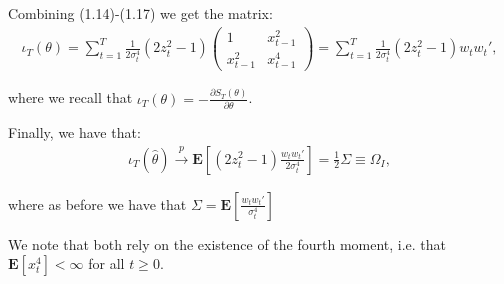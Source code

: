 \documentclass[11pt,a4paper,oneside]{article}
\newcommand{\lp}{\left(}
\newcommand{\rp}{\right)}
\newcommand{\rb}{\right]}
\newcommand{\lb}{\left[}
\newcommand{\ee}{\mathbf{E}}
\newcommand{\sumt}{\sum_{t=1}^T}
\begin{document}
Combining (1.14)-(1.17) we get the matrix:
\begin{align}
    \iota_T\lp \theta\rp =
        \sumt \frac{1}{2\sigma_t^4}\lp 2z_t^2 - 1\rp
        \begin{pmatrix}
            1           &   x_{t-1}^2\\
            x_{t-1}^2   &   x_{t-1}^4
        \end{pmatrix}
        = \sumt \frac{1}{2\sigma_t^4}\lp 2z_t^2 - 1\rp w_t w_t',
\end{align}

where we recall that $\iota_T\lp \theta\rp = - \frac{\partial S_T\lp \theta\rp}{\partial \theta}$.

Finally, we have that:
\begin{align}
    \iota_T\lp \hat \theta\rp \overset{p}{\rightarrow}\ee\lb \lp 2 z_t^2 - 1\rp \frac{w_tw_t'}{2 \sigma_t^4}\rb = \frac{1}{2}\Sigma \equiv \Omega_I,
\end{align}

where as before we have that $\Sigma = \ee\lb \frac{w_t w_t'}{\sigma_t^4}\rb$

We note that both rely on the existence of the fourth moment, i.e. that $\ee\lb x_t^4\rb < \infty$ for all $t \geq 0$.
\end{document}

